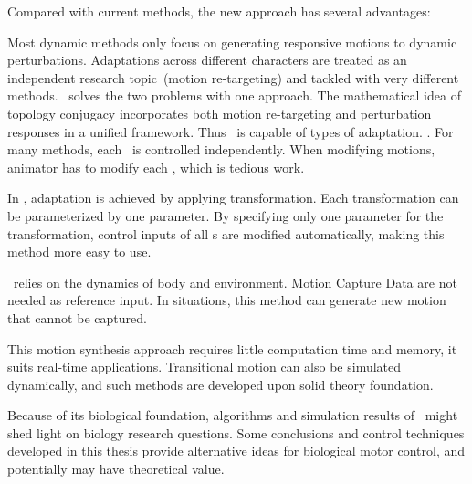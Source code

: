 Compared with current \cms methods, the new approach has several advantages:
\begin{enumerate}
Most dynamic methods only focus on generating responsive motions to dynamic perturbations.
Adaptations across different characters are treated as an independent research topic~(motion re-targeting) and tackled with very different methods.
{\moit}\ solves the two problems with one approach.
The mathematical idea of topology conjugacy  incorporates both motion re-targeting and  perturbation responses  in a unified framework.
Thus {\moit}\ is capable of types of adaptation.
.
For many \cms methods, each \dof ~is controlled independently.
When modifying motions, animator has to modify each \dof, which is tedious work.

In {\moit}, adaptation is achieved by applying transformation.
Each transformation can be parameterized by one parameter. 
By specifying only one parameter for the transformation, control inputs of all {\dof}s are modified automatically, making this method more easy to use.

{\moit}\ relies on the dynamics of body and environment.
Motion Capture Data are not needed as reference input.
In situations, this method can generate new motion that cannot be captured.


This motion synthesis approach requires little computation time and memory, it suits real-time applications.
Transitional motion can also be simulated dynamically, and such methods are developed upon solid theory foundation.

\end{enumerate}

Because of its biological foundation,
algorithms and simulation results of {\moit}\  might shed light on biology research questions.
Some conclusions and control techniques developed in this thesis provide alternative ideas for biological motor control, and potentially may have theoretical value.

